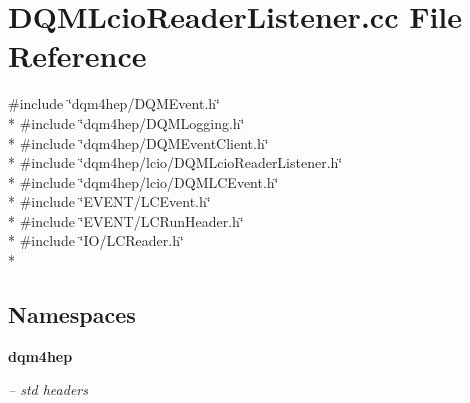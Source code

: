 \section{D\+Q\+M\+Lcio\+Reader\+Listener.\+cc File Reference}
\label{DQMLcioReaderListener_8cc}
{\ttfamily \#include \char`\"{}dqm4hep/\+D\+Q\+M\+Event.\+h\char`\"{}}\\*
{\ttfamily \#include \char`\"{}dqm4hep/\+D\+Q\+M\+Logging.\+h\char`\"{}}\\*
{\ttfamily \#include \char`\"{}dqm4hep/\+D\+Q\+M\+Event\+Client.\+h\char`\"{}}\\*
{\ttfamily \#include \char`\"{}dqm4hep/lcio/\+D\+Q\+M\+Lcio\+Reader\+Listener.\+h\char`\"{}}\\*
{\ttfamily \#include \char`\"{}dqm4hep/lcio/\+D\+Q\+M\+L\+C\+Event.\+h\char`\"{}}\\*
{\ttfamily \#include \char`\"{}E\+V\+E\+N\+T/\+L\+C\+Event.\+h\char`\"{}}\\*
{\ttfamily \#include \char`\"{}E\+V\+E\+N\+T/\+L\+C\+Run\+Header.\+h\char`\"{}}\\*
{\ttfamily \#include \char`\"{}I\+O/\+L\+C\+Reader.\+h\char`\"{}}\\*
\subsection*{Namespaces}
\begin{DoxyCompactItemize}
\item 
 {\bf dqm4hep}
\begin{DoxyCompactList}\small\item\em -- std headers \end{DoxyCompactList}\end{DoxyCompactItemize}
